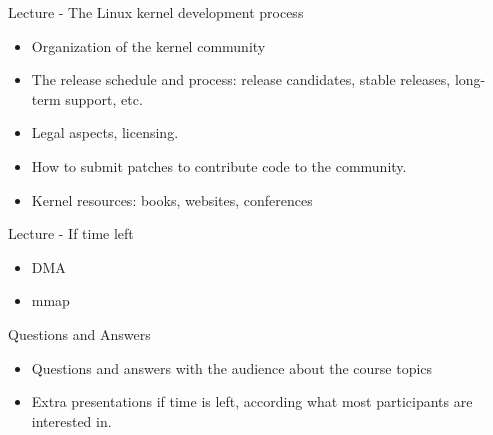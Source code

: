 \documentclass[a4paper,12pt,obeyspaces,spaces,hyphens]{article}
\begin{document}
\feagendaonecolumn
{Lecture - The Linux kernel development process}
{
  \begin{itemize}
  \item Organization of the kernel community
  \item The release schedule and process: release candidates, stable
    releases, long-term support, etc.
  \item Legal aspects, licensing.
  \item How to submit patches to contribute code to the community.
  \item Kernel resources: books, websites, conferences
  \end{itemize}
}

\feagendatwocolumn
{Lecture - If time left}
{
  \begin{itemize}
  \item DMA
  \item mmap
  \end{itemize}
}
{Questions and Answers}
{
  \begin{itemize}
  \item Questions and answers with the audience about the course topics
  \item Extra presentations if time is left, according what most
        participants are interested in.
  \end{itemize}
}
\end{document}
